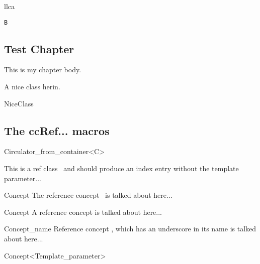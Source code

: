 \documentclass[12pt]{article}
\begin{document}
{\def\llcb{
\llca%
llca
}
\llcb

\def\llcc #1{\llca #1\llca }
\begin{alltt}
\llcc{\llca }B
\end{alltt}

\begin{lcHtmlBlock}
\chapter{Test Chapter}

This is my chapter body.

A nice class herin.

\begin{ccClass}{NiceClass}
\end{ccClass}
\end{lcHtmlBlock}

\section{The ccRef... macros}

\begin{ccRefClass}{Circulator_from_container<C>}

This is a ref class \ccRefName\ and should produce an index entry 
without the template parameter...
\end{ccRefClass}

\begin{ccRefConcept}{Concept}
The reference concept \ccRefName\ is talked about here...
\end{ccRefConcept}

\begin{ccRefConcept}[Scope::]{Concept}
A reference concept is talked about here...

\ccTypes
{}

\end{ccRefConcept}

\begin{ccRefConcept}{Concept_name}
Reference concept \ccRefName, which has an underscore in its name is 
talked about here...
\end{ccRefConcept}

\begin{ccRefConcept}{Concept<Template_parameter>}


\end{ccRefConcept}}
\end{document}
